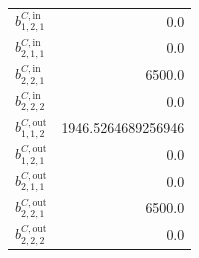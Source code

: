 \documentclass{article}%
\begin{document}
\begin{multicols*}{3}
\begin{supertabular}{lr}
	$b_{1,2,1}^{C,\text{in}}$ & 0.0 \\%
	$b_{2,1,1}^{C,\text{in}}$ & 0.0 \\%
	$b_{2,2,1}^{C,\text{in}}$ & 6500.0 \\%
	$b_{2,2,2}^{C,\text{in}}$ & 0.0 \\%
	$b_{1,1,2}^{C,\text{out}}$ & 1946.5264689256946 \\%
	$b_{1,2,1}^{C,\text{out}}$ & 0.0 \\%
	$b_{2,1,1}^{C,\text{out}}$ & 0.0 \\%
	$b_{2,2,1}^{C,\text{out}}$ & 6500.0 \\%
	$b_{2,2,2}^{C,\text{out}}$ & 0.0 \\%
\end{supertabular}%
\end{multicols*}%
\end{document}
